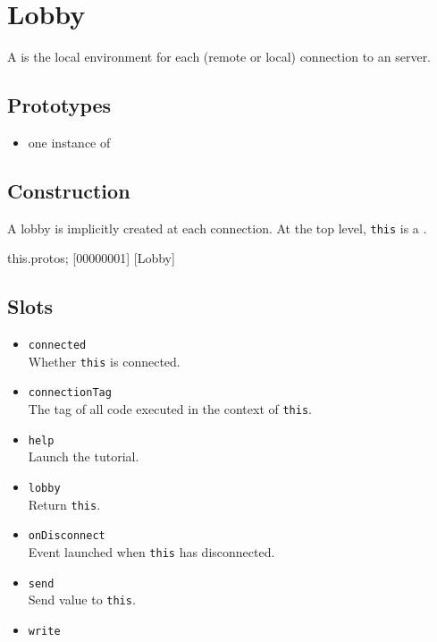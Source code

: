 \section{Lobby}

A  is the local environment for each (remote or local)
connection to an \urbi server.

\subsection{Prototypes}
\begin{itemize}
\item one instance of 
\end{itemize}

\subsection{Construction}

A lobby is implicitly created at each connection. At the top level,
\lstinline|this| is a .

\begin{urbiscript}
this.protos;
[00000001] [Lobby]
\end{urbiscript}

\subsection{Slots}
\begin{itemize}
\item \lstinline|connected|\\
  Whether \lstinline|this| is connected.

\item \lstinline|connectionTag|\\
  The tag of all code executed in the context of \lstinline|this|.

\item \lstinline|help|\\
  Launch the tutorial.

\item \lstinline|lobby|\\
  Return \lstinline|this|.

\item \lstinline|onDisconnect|\\
  Event launched when \lstinline|this| has disconnected.

\item \lstinline|send|\\
  Send value to \lstinline|this|.

\item \lstinline|write|\\
\end{itemize}

